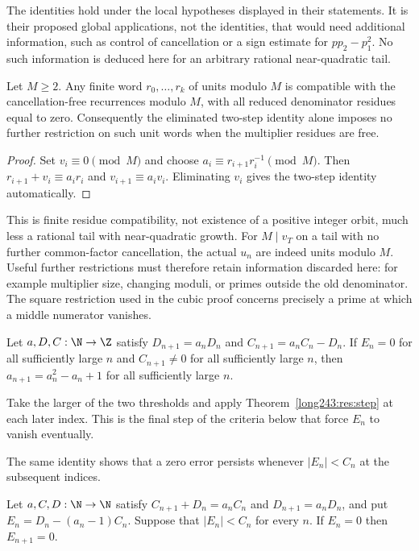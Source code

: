 The identities hold under the local hypotheses displayed in their
statements. It is their proposed global applications, not the identities,
that would need additional information, such as control of cancellation or
a sign estimate for $pp_2-p_1^2$. No such information is deduced here for
an arbitrary rational near-quadratic tail.

\begin{lemma}\label{long243:res:oldmodulussaturation}
Let $M\ge2$. Any finite word $r_0,\ldots,r_k$ of units modulo $M$ is
compatible with the cancellation-free recurrences modulo $M$, with all
reduced denominator residues equal to zero. Consequently the eliminated
two-step identity alone imposes no further restriction on such unit words
when the multiplier residues are free.
\end{lemma}
\begin{proof}
Set $v_i\equiv0\pmod M$ and choose
$a_i\equiv r_{i+1}r_i^{-1}\pmod M$. Then
$r_{i+1}+v_i\equiv a_ir_i$ and $v_{i+1}\equiv a_iv_i$.
Eliminating $v_i$ gives the two-step identity automatically.
\end{proof}
This is finite residue compatibility, not existence of a positive integer
orbit, much less a rational tail with near-quadratic growth.
For $M\mid v_T$ on a tail with no further common-factor cancellation,
the actual $u_n$ are indeed units modulo
$M$. Useful further restrictions must therefore retain information discarded
here: for example multiplier size, changing moduli, or primes outside the
old denominator. The square restriction used in the cubic proof concerns
precisely a prime at which a middle numerator vanishes.

\begin{theorem}\label{long243:res:eventual}
Let $a,D,C:\N\to\Z$ satisfy $D_{n+1}=a_nD_n$ and
$C_{n+1}=a_nC_n-D_n$.  If $E_n=0$ for all sufficiently large $n$ and
$C_{n+1}\ne0$ for all sufficiently large $n$, then $a_{n+1}=a_n^{2}-a_n+1$ for
all sufficiently large $n$.
\end{theorem}

  Take the larger of the two thresholds and apply
Theorem~\ref{long243:res:step} at each later index. This is the final
step of the criteria below that force $E_n$ to vanish eventually.

The same identity shows that a zero error persists whenever
$|E_n|<C_n$ at the subsequent indices.

\begin{theorem}\label{long243:res:absorb}
Let $a,C,D:\N\to\N$ satisfy $C_{n+1}+D_n=a_nC_n$ and
$D_{n+1}=a_nD_n$, and put $E_n=D_n-(a_n-1)C_n$.
Suppose that $|E_n|<C_n$ for every $n$.  If $E_n=0$ then $E_{n+1}=0$.
\end{theorem}

